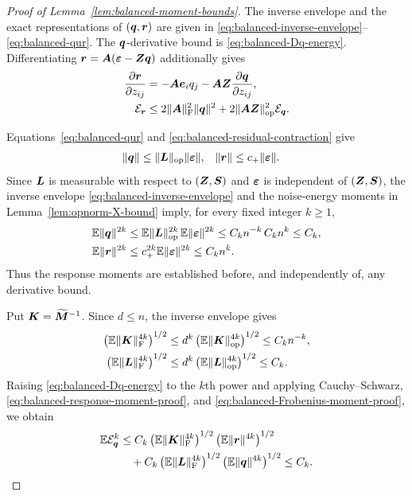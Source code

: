 \documentclass{article}
\theoremstyle{plain} %
\theoremstyle{definition} %
\theoremstyle{definition} %
\begin{document}
\begin{proof}[Proof of Lemma~\ref{lem:balanced-moment-bounds}]
The inverse envelope and the exact representations of $(\boldsymbol{q},\boldsymbol{r})$ are given
in \eqref{eq:balanced-inverse-envelope}--\eqref{eq:balanced-qur}.  The
$\boldsymbol{q}$-derivative bound is \eqref{eq:balanced-Dq-energy}.
Differentiating $\boldsymbol{r}=\boldsymbol{A}({\boldsymbol{\varepsilon} }-\boldsymbol{Z}\boldsymbol{q})$ additionally gives
\begin{align}
    \pdv{\boldsymbol{r}}{z_{ij}}
    &=-\boldsymbol{A}\boldsymbol{e}_i q_j-\boldsymbol{A}\boldsymbol{Z}\pdv{\boldsymbol{q}}{z_{ij}},\notag\\
    {\mathcal E}_{\boldsymbol{r}}
    &\leq
      2\lVert\boldsymbol{A}\rVert_{\rm F}^2\lVert\boldsymbol{q}\rVert^2
      +2\lVert\boldsymbol{A}\boldsymbol{Z}\rVert_{\rm op}^2{\mathcal E}_{\boldsymbol{q}}.
    \label{eq:balanced-Dr-energy}
\end{align}

Equations~\eqref{eq:balanced-qur} and
\eqref{eq:balanced-residual-contraction} give
\begin{align*}
    \lVert\boldsymbol{q}\rVert
    &\leq\lVert\boldsymbol{L}\rVert_{\rm op}\lVert{\boldsymbol{\varepsilon} }\rVert,
    &
    \lVert\boldsymbol{r}\rVert
    &\leq c_+\lVert{\boldsymbol{\varepsilon} }\rVert.
\end{align*}
Since $\boldsymbol{L}$ is measurable with respect to $(\boldsymbol{Z},\boldsymbol{S})$ and ${\boldsymbol{\varepsilon} }$ is
independent of $(\boldsymbol{Z},\boldsymbol{S})$, the inverse envelope
\eqref{eq:balanced-inverse-envelope} and the noise-energy moments in
Lemma~\ref{lem:opnorm-X-bound} imply, for every fixed integer $k\geq1$,
\begin{align}
    {\mathbb{E}}\lVert\boldsymbol{q}\rVert^{2k}
    &\leq {\mathbb{E}}\lVert\boldsymbol{L}\rVert_{\rm op}^{2k}\,
       {\mathbb{E}}\lVert{\boldsymbol{\varepsilon} }\rVert^{2k}
     \leq C_kn^{-k}\,C_kn^k
     \leq C_k,\notag\\
    {\mathbb{E}}\lVert\boldsymbol{r}\rVert^{2k}
    &\leq c_+^{2k}{\mathbb{E}}\lVert{\boldsymbol{\varepsilon} }\rVert^{2k}
     \leq C_kn^k.
    \label{eq:balanced-response-moment-proof}
\end{align}
Thus the response moments are established before, and independently of, any
derivative bound.

Put $\boldsymbol{K}=\widetilde{\boldsymbol{M}}^{-1}$.  Since $d\leq n$, the inverse envelope gives
\begin{align}
    \left({\mathbb{E}}\lVert\boldsymbol{K}\rVert_{\rm F}^{4k}\right)^{1/2}
    &\leq d^k
       \left({\mathbb{E}}\lVert\boldsymbol{K}\rVert_{\rm op}^{4k}\right)^{1/2}
      \leq C_kn^{-k},\notag\\
    \left({\mathbb{E}}\lVert\boldsymbol{L}\rVert_{\rm F}^{4k}\right)^{1/2}
    &\leq d^k
       \left({\mathbb{E}}\lVert\boldsymbol{L}\rVert_{\rm op}^{4k}\right)^{1/2}
      \leq C_k.
    \label{eq:balanced-Frobenius-moment-proof}
\end{align}
Raising \eqref{eq:balanced-Dq-energy} to the $k$th power and applying
Cauchy--Schwarz, \eqref{eq:balanced-response-moment-proof}, and
\eqref{eq:balanced-Frobenius-moment-proof}, we obtain
\begin{align}
    {\mathbb{E}}{\mathcal E}_{\boldsymbol{q}}^{k}
    &\leq C_k
       \left({\mathbb{E}}\lVert\boldsymbol{K}\rVert_{\rm F}^{4k}\right)^{1/2}
       \left({\mathbb{E}}\lVert\boldsymbol{r}\rVert^{4k}\right)^{1/2}\notag\\
    &\quad+C_k
       \left({\mathbb{E}}\lVert\boldsymbol{L}\rVert_{\rm F}^{4k}\right)^{1/2}
       \left({\mathbb{E}}\lVert\boldsymbol{q}\rVert^{4k}\right)^{1/2}
     \leq C_k.
    \label{eq:balanced-Dq-all-moments}
\end{align}


\end{proof}
\end{document}
